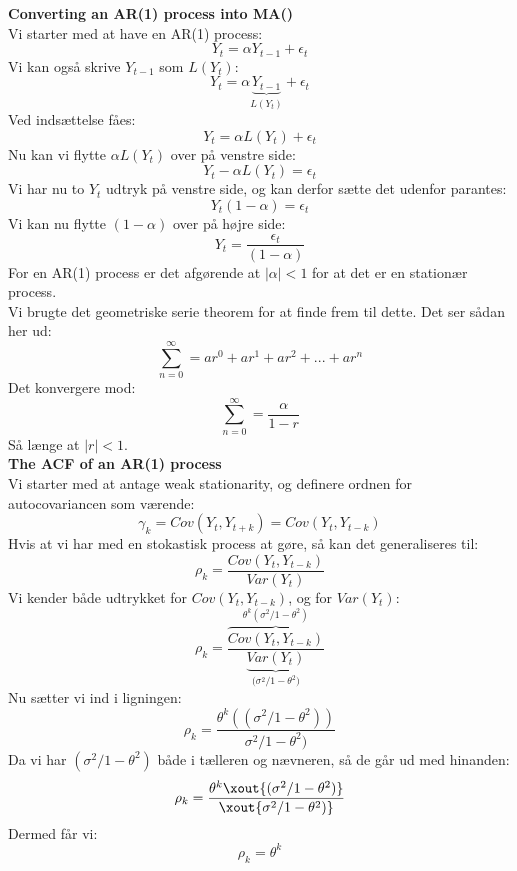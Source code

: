 \documentclass[
  10pt,
]{article}
\begin{document}
\textbf{Converting an AR(1) process into MA(\infty)}\\
Vi starter med at have en AR(1) process:\\
\[Y_t = \alpha Y_{t-1} + \epsilon_t \] Vi kan også skrive \(Y_{t-1}\)
som \(L(Y_t)\):\\
\[Y_t = \alpha \underbrace{Y_{t-1}}_\text{$L(Y_t)$} +\epsilon_t \] Ved
indsættelse fåes:\\
\[Y_t = \alpha L(Y_t) +\epsilon_t \] Nu kan vi flytte \(\alpha L(Y_t)\)
over på venstre side:\\
\[Y_t - \alpha L(Y_t) =  \epsilon_t \] Vi har nu to \(Y_t\) udtryk på
venstre side, og kan derfor sætte det udenfor parantes:\\
\[Y_t(1-\alpha) =  \epsilon_t \] Vi kan nu flytte \((1-\alpha)\) over på
højre side:\\
\[Y_t = \frac{\epsilon_t}{(1-\alpha)}  \] For en AR(1) process er det
afgørende at \(|\alpha|<1\) for at det er en stationær process.\\
Vi brugte det geometriske serie theorem for at finde frem til dette. Det
ser sådan her ud:\\
\[\sum_{n=0}^\infty =  ar^0 + ar^1 + ar^2 + ... + ar^n \] Det konvergere
mod:\\
\[\sum_{n=0}^\infty = \frac{\alpha}{1-r}  \] Så længe at \(|r|<1\).\\

\textbf{The ACF of an AR(1) process}\\
Vi starter med at antage weak stationarity, og definere ordnen for
autocovariancen som værende:\\
\[\gamma_k = Cov(Y_t,Y_{t+k})=Cov(Y_t,Y_{t-k}) \] Hvis at vi har med en
stokastisk process at gøre, så kan det generaliseres til:\\
\[\rho_k = \frac{Cov(Y_t,Y_{t-k})}{Var(Y_t)} \] Vi kender både udtrykket
for \(Cov(Y_t,Y_{t-k})\), og for \(Var(Y_t)\):\\
\[\rho_k = \frac{\overbrace{Cov(Y_t,Y_{t-k})}^{\theta^k (\sigma^2/1-\theta^2)}}{\underbrace{Var(Y_t)}_\text{($\sigma^2/1-\theta^2$)}} \]
Nu sætter vi ind i ligningen:\\
\[\rho_k = \frac{\theta^k ((\sigma^2/1-\theta^2))}{\sigma^2/1-\theta^2)} \]
Da vi har \((\sigma^2/1-\theta^2)\) både i tælleren og nævneren, så de
går ud med hinanden:\\
\[\rho_k = \frac{\theta^k \xout{(\sigma^2/1-\theta^2)}}{\xout{\sigma^2/1-\theta^2)}} \]
Dermed får vi:\\
\[\rho_k = \theta^k  \]
\end{document}
